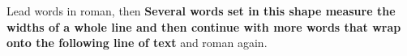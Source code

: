 \documentclass{article}
\begin{document}
Lead words in roman, then \textbf{Several words set in this shape measure the widths of a whole line and then continue with more words that wrap onto the following line of text} and roman again.
\end{document}
